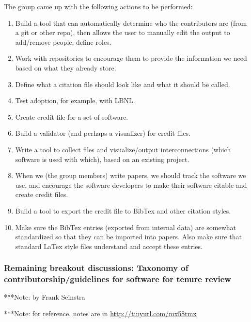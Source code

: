 \documentclass[11pt, oneside]{amsart}
\newcommand{\note}[1]{ {\textcolor{blueish}    { ***Note:      #1 }}}
\begin{document}
The group came up with the following actions to be performed:
\begin{enumerate}
\item Build a tool that can automatically determine who the contributors are (from a git or other repo), then allows the user to manually edit the output to add/remove people, define roles. 
\item Work with repositories to encourage them to provide the information we need based on what they already store.
\item Define what a citation file should look like and what it should be called.
\item Test adoption, for example, with LBNL.
\item Create credit file for a set of software.
\item Build a validator (and perhaps a visualizer) for credit files.
\item Write a tool to collect files and visualize/output interconnections (which software is used with which), based on an existing project.
\item When we (the group members) write papers, we should track the software we use, and encourage the software developers to make their software citable and create credit files.
\item Build a tool to export the credit file to BibTex and other citation styles.
\item Make sure the BibTex entries (exported from internal data) are somewhat standardized so that they can be imported into papers.  Also make sure that standard LaTex style files understand and accept these entries.
\end{enumerate}




\subsubsection{Remaining breakout discussions: Taxonomy of contributorship/guidelines for software for tenure review}
\note{by Frank Seinstra}

\note{for reference, notes are in \url{http://tinyurl.com/mx58tmx}}
\end{document}
